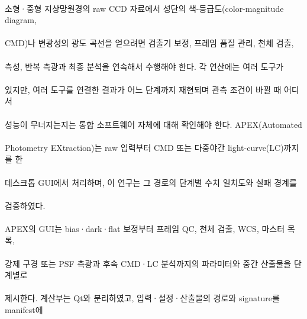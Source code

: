 \paragraph*{}소형·중형 지상망원경의 raw CCD 자료에서 성단의 색-등급도(color-magnitude diagram,
\paragraph*{}CMD)나 변광성의 광도 곡선을 얻으려면 검출기 보정, 프레임 품질 관리, 천체 검출,
\paragraph*{}측성, 반복 측광과 최종 분석을 연속해서 수행해야 한다. 각 연산에는 여러 도구가
\paragraph*{}있지만, 여러 도구를 연결한 결과가 어느 단계까지 재현되며 관측 조건이 바뀔 때 어디서
\paragraph*{}성능이 무너지는지는 통합 소프트웨어 자체에 대해 확인해야 한다. APEX(Automated
\paragraph*{}Photometry EXtraction)는 raw 입력부터 CMD 또는 다중야간 light-curve(LC)까지를 한
\paragraph*{}데스크톱 GUI에서 처리하며, 이 연구는 그 경로의 단계별 수치 일치도와 실패 경계를
\paragraph*{}검증하였다.
\paragraph*{}APEX의 GUI는 bias·dark·flat 보정부터 프레임 QC, 천체 검출, WCS, 마스터 목록,
\paragraph*{}강제 구경 또는 PSF 측광과 후속 CMD·LC 분석까지의 파라미터와 중간 산출물을 단계별로
\paragraph*{}제시한다. 계산부는 Qt와 분리하였고, 입력·설정·산출물의 경로와 signature를 manifest에
